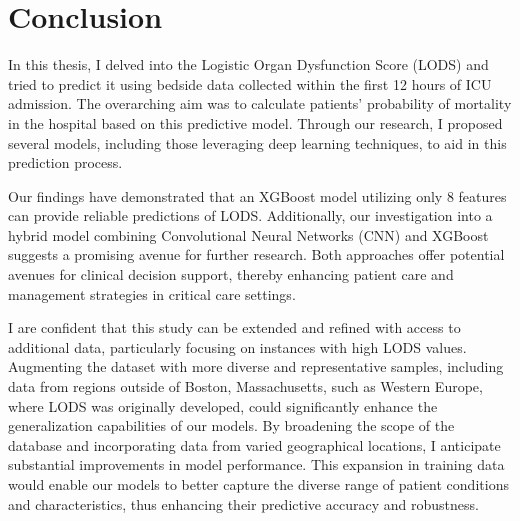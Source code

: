 \documentclass[12pt,a4paper,english
]{tunithesis}
\begin{document}
 

\chapter{Conclusion}
\label{ch:conclusion}

In this thesis, I delved into the Logistic Organ Dysfunction Score (LODS) and tried to predict it using bedside data collected within the first 12 hours of ICU admission. The overarching aim was to calculate patients' probability of mortality in the hospital based on this predictive model. Through our research, I proposed several models, including those leveraging deep learning techniques, to aid in this prediction process.

Our findings have demonstrated that an XGBoost model utilizing only 8 features can provide reliable predictions of LODS. Additionally, our investigation into a hybrid model combining Convolutional Neural Networks (CNN) and XGBoost suggests a promising avenue for further research. Both approaches offer potential avenues for clinical decision support, thereby enhancing patient care and management strategies in critical care settings.

I are confident that this study can be extended and refined with access to additional data, particularly focusing on instances with high LODS values. Augmenting the dataset with more diverse and representative samples, including data from regions outside of Boston, Massachusetts, such as Western Europe, where LODS was originally developed, could significantly enhance the generalization capabilities of our models. By broadening the scope of the database and incorporating data from varied geographical locations, I anticipate substantial improvements in model performance. This expansion in training data would enable our models to better capture the diverse range of patient conditions and characteristics, thus enhancing their predictive accuracy and robustness.

 




\newpage

\printbibliography[title=References]
\end{document}
